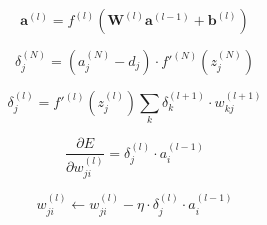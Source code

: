 
\begin{equation}
\mathbf{a}^{(l)} = f^{(l)}\left( \mathbf{W}^{(l)} \mathbf{a}^{(l-1)} + \mathbf{b}^{(l)} \right)
\end{equation}

\begin{equation}
\delta^{(N)}_j = (a^{(N)}_j - d_j) \cdot f'^{(N)}\left( z^{(N)}_j \right)
\end{equation}

\begin{equation}
\boxed{\delta^{(l)}_j = f'^{(l)}\left( z^{(l)}_j \right) \sum_{k} \delta^{(l+1)}_k \cdot w^{(l+1)}_{k j}}
\end{equation}

\begin{equation}
\frac{\partial E}{\partial w^{(l)}_{j i}} = \delta^{(l)}_j \cdot a^{(l-1)}_i
\end{equation}

\begin{equation}
w^{(l)}_{j i} \leftarrow w^{(l)}_{j i} - \eta \cdot \delta^{(l)}_j \cdot a^{(l-1)}_i
\end{equation}